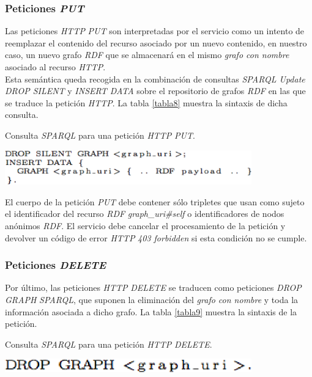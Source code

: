 \subsubsection{Peticiones \textit{PUT}}

Las peticiones \textit{HTTP} \textit{PUT} son interpretadas por el servicio como un intento de reemplazar el contenido del recurso asociado por un nuevo contenido, en nuestro caso, un nuevo grafo \textit{RDF} que se almacenar\'a en el mismo \textit{grafo con nombre} asociado al recurso \textit{HTTP}.\\
Esta sem\'antica queda recogida en la combinaci\'on de consultas \textit{SPARQL Update} \textit{DROP SILENT} y \textit{INSERT DATA} sobre el repositorio de grafos \textit{RDF} en las que se traduce la petici\'on \textit{HTTP}. La tabla \ref{tabla8} muestra la sintaxis de dicha consulta.\\

\begin{table}
\vspace{2.4in}
\caption{Consulta \textit{SPARQL} para una petici\'on \textit{HTTP} \textit{PUT}.}
\vspace{5mm}
\includegraphics[width=0.8\textwidth]{tabla8}
\label{tabla8}
\end{table}

El cuerpo de la petici\'on \textit{PUT} debe contener s\'olo tripletes que usan como sujeto el identificador del recurso \textit{RDF} \textit{graph\_uri\#self} o identificadores de nodos an\'onimos \textit{RDF}. El servicio debe cancelar el procesamiento de la petici\'on y devolver un c\'odigo de error \textit{HTTP} \textit{403 forbidden} si esta condici\'on no se cumple.

\subsubsection{Peticiones \textit{DELETE}}

Por \'ultimo, las peticiones \textit{HTTP} \textit{DELETE} se traducen como peticiones \textit{DROP GRAPH} \textit{SPARQL}, que suponen la eliminaci\'on del \textit{grafo con nombre} y toda la informaci\'on asociada a dicho grafo. La tabla \ref{tabla9} muestra la sintaxis de la petici\'on.\\

\begin{table}
\vspace{2.4in}
\caption{Consulta \textit{SPARQL} para una petici\'on \textit{HTTP} \textit{DELETE}.}
\vspace{5mm}
\includegraphics[width=0.8\textwidth]{tabla9}
\label{tabla9}
\end{table}


